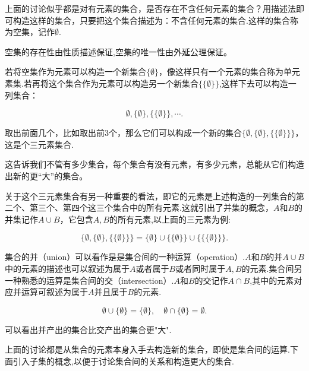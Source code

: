 上面的讨论似乎都是对有元素的集合，是否存在不含任何元素的集合？用描述法即可构造这样的集合，只要把这个集合描述为：不含任何元素的集合.这样的集合称为空集，记作$\emptyset$.

\begin{note}
    空集的存在性由性质描述保证,空集的唯一性由外延公理保证。
\end{note}

若将空集作为元素可以构造一个新集合$\{\emptyset\}$，像这样只有一个元素的集合称为单元素集.若再将这个集合作为元素可以构造另一个新集合$\{\{\emptyset\}\}$,这样下去可以构造一列集合：

\[
\emptyset,\{\emptyset\},\{\{\emptyset\}\},\cdots .   
\]

取出前面几个，比如取出前$3$个，那么它们可以构成一个新的集合$\{\emptyset,\{\emptyset\},\{\{\emptyset\}\}\}$，这是个三元素集合.

\begin{note}
    这告诉我们不管有多少集合，每个集合有没有元素，有多少元素，总能从它们构造出新的更“大”的集合。
\end{note}

关于这个三元素集合有另一种重要的看法，即它的元素是上述构造的一列集合的第二个、第三个、第四个这三个集合中的所有元素.这就引出了并集的概念，$A$和$B$的并集记作$A\cup B$，它包含$A,B$的所有元素,以上面的三元素为例:

\begin{example}
    \[
    \{\emptyset,\{\emptyset\},\{\{\emptyset\}\}\}=\{\emptyset\}\cup\{\{\emptyset\}\}\cup\{\{\{\emptyset\}\}\}.
\]
\end{example}

集合的并（union）可以看作是是集合间的一种运算（operation）.$A$和$B$的并$A\cup B$中的元素的描述也可以叙述为属于$A$或者属于$B$或者同时属于$A,B$的元素.集合间另一种熟悉的运算是集合间的交（intersection）.$A$和$B$的交记作$A\cap B$,其中的元素对应并运算可叙述为属于$A$并且属于$B$的元素.

\begin{example}
    \[
    \emptyset\cup\{\emptyset\}=\{\emptyset\},\quad \emptyset\cap\{\emptyset\}=\emptyset.    
    \]
\end{example}
\begin{note}
    可以看出并产出的集合比交产出的集合更"大".
\end{note}

\begin{note}
    上面的讨论都是从集合的元素本身入手去构造新的集合，即使是集合间的运算.下面引入子集的概念,以便于讨论集合间的关系和构造更大的集合.
\end{note}

